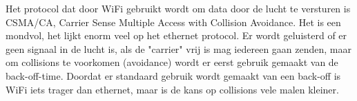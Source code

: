 Het protocol dat door WiFi gebruikt wordt om data door de lucht te versturen is CSMA/CA, Carrier Sense Multiple Access with Collision Avoidance. Het is een mondvol, het lijkt enorm veel op het ethernet protocol. Er wordt geluisterd of er geen signaal in de lucht is, als de "carrier" vrij is mag iedereen gaan zenden, maar om collisions te voorkomen (avoidance) wordt er eerst gebruik gemaakt van de back-off-time. Doordat er standaard gebruik wordt gemaakt van een back-off is WiFi iets trager dan ethernet, maar is de kans op collisions vele malen kleiner.
